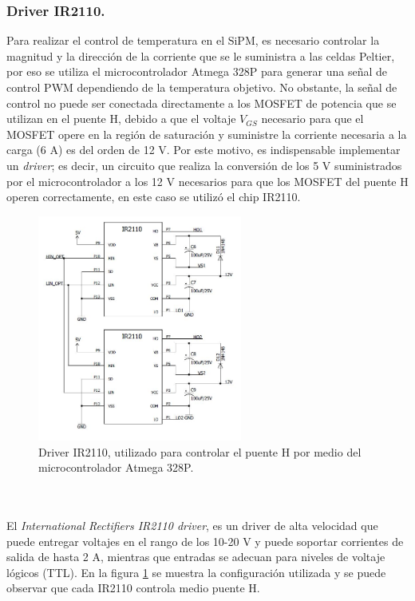 \subsubsection{Driver IR2110.}
Para realizar el control de temperatura en el SiPM, es necesario controlar la magnitud y la dirección de la corriente que se le suministra a las celdas Peltier, por eso se utiliza  el microcontrolador Atmega 328P para generar una señal de control PWM dependiendo de la temperatura objetivo. No obstante, la señal de control no puede ser conectada directamente a los MOSFET de potencia que se utilizan en el puente H, debido a que el voltaje $V_{GS}$ necesario para que el MOSFET opere en la región de saturación y suministre la corriente necesaria a la carga (6 A) es del orden de 12 V. Por este motivo, es indispensable implementar un \textit{driver}; es decir, un circuito que realiza la conversión de los 5 V suministrados por el microcontrolador a los 12 V necesarios para que los MOSFET del puente H operen correctamente, en este caso se utilizó el chip IR2110.
\begin{figure}[h!]
\begin{centering}
  \includegraphics[width=0.6\textwidth]{Images/Driver.JPG}
    \caption{Driver IR2110, utilizado para controlar el puente H por medio del microcontrolador Atmega 328P.}
    \label{fig:Driver}  
  \par\end{centering}
\end{figure}
\\ \\
El \textit{ International Rectifiers IR2110 driver}, es un driver de alta velocidad que puede entregar voltajes en el rango de los 10-20 V y puede soportar  corrientes de salida de hasta 2 A, mientras que entradas se adecuan para niveles de voltaje lógicos (TTL). En la figura \ref{fig:Driver}  se muestra la configuración utilizada y se puede observar que cada IR2110 controla medio puente H.\\ \\
